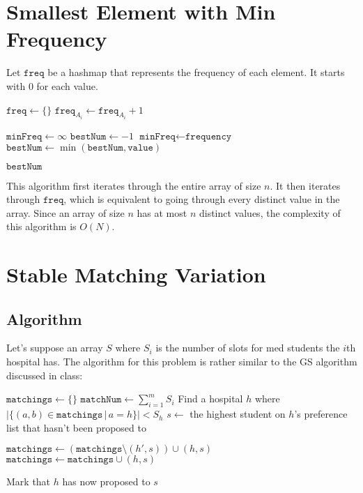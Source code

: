 \documentclass[12pt]{article}
\begin{document}
\section{Smallest Element with Min Frequency}

Let $\texttt{freq}$ be a hashmap that represents the frequency of each element.
It starts with $0$ for each value.

\begin{algorithmic}[1]
    \State $\texttt{freq} \gets \{\}$
    \State $\texttt{freq}_{A_i} \gets \texttt{freq}_{A_i} + 1$
    \EndFor

    \State $\texttt{minFreq} \gets \infty$
    \State $\texttt{bestNum} \gets -1$
    \State $\texttt{minFreq} \gets \texttt{frequency}$
    \State $\texttt{bestNum} \gets \min(\texttt{bestNum}, \texttt{value})$
    \EndIf
    \EndFor

    \State \Return $\texttt{bestNum}$
\end{algorithmic}

This algorithm first iterates through the entire array of size $n$.
It then iterates through $\texttt{freq}$, which is equivalent to going through
every distinct value in the array.
Since an array of size $n$ has at most $n$ distinct values,
the complexity of this algorithm is $O(N)$.

\section{Stable Matching Variation}

\subsection{Algorithm}

Let's suppose an array $S$ where $S_i$ is the number of slots for med students
the $i$th hospital has.
The algorithm for this problem is rather similar to the GS algorithm discussed in class:
\begin{algorithmic}[1]
    \State $\texttt{matchings} \gets \{\}$
    \State $\texttt{matchNum} \gets \sum_{i=1}^{m} S_i$
    \State Find a hospital $h$ where $|\{(a, b) \in \texttt{matchings}\,|\,a = h\}| < S_h$
    \State $s \gets$ the highest student on $h$'s preference list that hasn't been proposed to
    \item[]
    \State $\texttt{matchings} \gets (\texttt{matchings} \setminus (h', s)) \cup (h, s)$
    \EndIf
    \Else
    \State $\texttt{matchings} \gets \texttt{matchings} \cup (h, s)$
    \EndIf
    \item[]
    \State Mark that $h$ has now proposed to $s$
    \EndWhile
\end{algorithmic}
\end{document}

